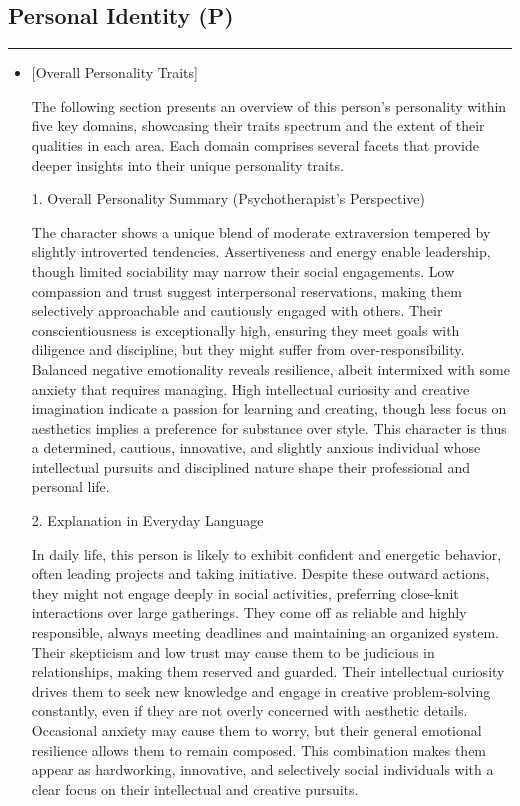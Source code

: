 \subsection{Personal Identity (P)}
\label{sec:appendix_profile_example_P_A2}

\noindent\rule{\columnwidth}{0.3mm}
\begin{itemize}
\item

[Overall Personality Traits]

The following section presents an overview of this person's personality within five key domains, showcasing their traits spectrum and the extent of their qualities in each area. Each domain comprises several facets that provide deeper insights into their unique personality traits.


1. Overall Personality Summary (Psychotherapist’s Perspective)

The character shows a unique blend of moderate extraversion tempered by slightly introverted tendencies. Assertiveness and energy enable leadership, though limited sociability may narrow their social engagements. Low compassion and trust suggest interpersonal reservations, making them selectively approachable and cautiously engaged with others. Their conscientiousness is exceptionally high, ensuring they meet goals with diligence and discipline, but they might suffer from over-responsibility. Balanced negative emotionality reveals resilience, albeit intermixed with some anxiety that requires managing. High intellectual curiosity and creative imagination indicate a passion for learning and creating, though less focus on aesthetics implies a preference for substance over style. This character is thus a determined, cautious, innovative, and slightly anxious individual whose intellectual pursuits and disciplined nature shape their professional and personal life.


2. Explanation in Everyday Language

In daily life, this person is likely to exhibit confident and energetic behavior, often leading projects and taking initiative. Despite these outward actions, they might not engage deeply in social activities, preferring close-knit interactions over large gatherings. They come off as reliable and highly responsible, always meeting deadlines and maintaining an organized system. Their skepticism and low trust may cause them to be judicious in relationships, making them reserved and guarded. Their intellectual curiosity drives them to seek new knowledge and engage in creative problem-solving constantly, even if they are not overly concerned with aesthetic details. Occasional anxiety may cause them to worry, but their general emotional resilience allows them to remain composed. This combination makes them appear as hardworking, innovative, and selectively social individuals with a clear focus on their intellectual and creative pursuits.
\end{itemize}

